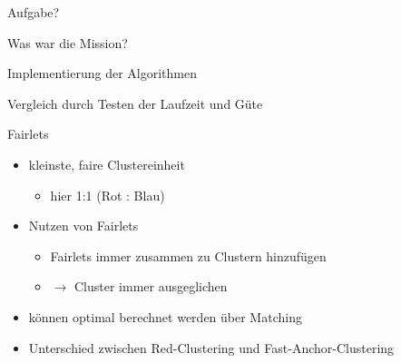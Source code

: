 \begin{frame}{Aufgabe?}
    \begin{LARGE}
        \begin{center}
            \color{hhuBlau}
            \Large Was war die Mission?
        \end{center}
    \end{LARGE} 
    \vspace{0.2\textheight}
    \begin{minipage}[t]{0.49\textwidth}
        \begin{center}
            \begin{large}
                Implementierung der Algorithmen
            \end{large}
        \end{center}
    \end{minipage}
    \hfill
    \begin{minipage}[t]{0.49\textwidth}
        \begin{center}
            \begin{large}
                Vergleich durch Testen der Laufzeit und Güte
            \end{large}
        \end{center}
    \end{minipage} 
\end{frame}























\begin{frame}{Fairlets}
    \begin{itemize}
        \item kleinste, faire Clustereinheit
        \begin{itemize}
            \item hier 1:1 (Rot : Blau)
        \end{itemize}
        \item Nutzen von Fairlets
        \begin{itemize}
            \item Fairlets immer zusammen zu Clustern hinzufügen
            \item $\rightarrow$ Cluster immer ausgeglichen
        \end{itemize}
        \item können optimal berechnet werden über Matching
        \item Unterschied zwischen Red-Clustering und Fast-Anchor-Clustering
    \end{itemize}

\end{frame}













